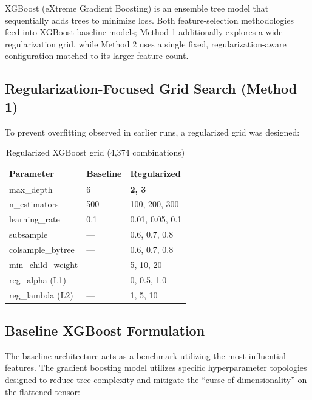 XGBoost (eXtreme Gradient Boosting) is an ensemble tree model that sequentially adds trees to minimize loss. Both feature-selection methodologies feed into XGBoost baseline models; Method 1 additionally explores a wide regularization grid, while Method 2 uses a single fixed, regularization-aware configuration matched to its larger feature count.

\subsection{Regularization-Focused Grid Search (Method 1)}
To prevent overfitting observed in earlier runs, a regularized grid was designed:

\begin{table}[H]
\centering
\caption{Regularized XGBoost grid (4,374 combinations)}
\label{tab:xgb_grid}
\normalsize
\renewcommand{\arraystretch}{1.2}
\begin{tabular}{|l|l|l|}
\hline
\textbf{Parameter} & \textbf{Baseline} & \textbf{Regularized} \\
\hline
max\_depth & 6 & \textbf{2, 3} \\
\hline
n\_estimators & 500 & 100, 200, 300 \\
\hline
learning\_rate & 0.1 & 0.01, 0.05, 0.1 \\
\hline
subsample & --- & 0.6, 0.7, 0.8 \\
\hline
colsample\_bytree & --- & 0.6, 0.7, 0.8 \\
\hline
min\_child\_weight & --- & 5, 10, 20 \\
\hline
reg\_alpha (L1) & --- & 0, 0.5, 1.0 \\
\hline
reg\_lambda (L2) & --- & 1, 5, 10 \\
\hline
\end{tabular}
\end{table}

\subsection{Baseline XGBoost Formulation}
The baseline architecture acts as a benchmark utilizing the most influential features. The gradient boosting model utilizes specific hyperparameter topologies designed to reduce tree complexity and mitigate the ``curse of dimensionality'' on the flattened tensor:

